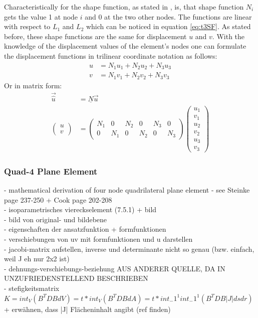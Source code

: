\documentclass[11pt,twoside]{scrartcl}
\begin{document}
  Characteristically for the shape function, as stated in \cite{steinke2005finite}, is, that shape function $N_i$ gets the value 1 at node $i$ and 0 at the two other nodes. The functions are linear with respect to $L_1$ and $L_2$ which can be noticed in equation \ref{eq:t3SF}. As stated before, these shape functions are the same for displacement $u$ and $v$. With the knowledge of the displacement values of the element's nodes one can formulate the displacement functions in trilinear coordinate notation as follows:
  \begin{align}
  u &= N_1 u_1 + N_2 u_2 + N_3 u_3 \nonumber\\
  v &= N_1 v_1 + N_2 v_2 + N_3 v_3
  \end{align}
  Or in matrix form:
  \begin{align}
  \vec{\hat{u}} &= \underline{N} \vec{u} \nonumber\\
  \begin{pmatrix}
  u \\ v
  \end{pmatrix} &= \begin{pmatrix}
  N_1 & 0 & N_2 & 0 & N_3 & 0 \\
  0 & N_1 & 0 & N_2 & 0 & N_3
  \end{pmatrix} \begin{pmatrix}
  u_1 \\ v_1 \\ u_2 \\ v_2 \\ u_3 \\ v_3
  \end{pmatrix}
  \end{align}
  \subsubsection{Quad-4 Plane Element}
  - mathematical derivation of four node quadrilateral plane element\newline
  - see Steinke \cite{steinke2005finite} page 237-250 + Cook \cite{cook2002concepts} page 202-208\\
  - isoparametrisches viereckselement (7.5.1) + bild\\
  - bild von original- und bildebene\\
  - eigenschaften der ansatzfunktion + formfunktionen\\
  - verschiebungen von uv mit formfunktionen und u darstellen\\
  - jacobi-matrix aufstellen, inverse und determinante nicht so genau (bzw. einfach, weil J eh nur 2x2 ist)\\
  - dehnungs-verschiebungs-beziehung AUS ANDERER QUELLE, DA IN \cite{steinke2005finite} UNZUFRIEDENSTELLEND BESCHRIEBEN\\
  - stefigkeitsmatrix $K = int_V(B^TDBdV) = t*int_V(B^TDBdA) = t*int_-1^1 int_-1^1(B^TDB|J|dsdr)$ + erwähnen, dass |J| Flächeninhalt angibt (ref finden)
\end{document}
